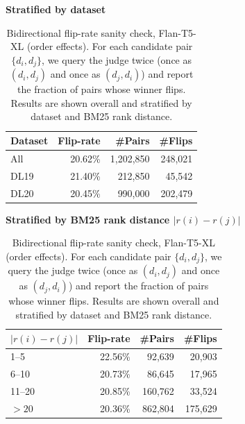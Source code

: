 \documentclass[11pt]{article}
\begin{document}
\begin{table}[!hbp]
\centering
\small
\renewcommand{\arraystretch}{1.15}
\setlength{\tabcolsep}{6pt}

\begin{minipage}[t]{0.48\textwidth}
\centering
\textbf{Stratified by dataset}\\[2pt]
\begin{tabular}{lrrr}
\hline
Dataset & Flip-rate & \#Pairs & \#Flips \\
\hline
All   & 20.62\% & 1,202,850 & 248,021 \\
DL19  & 21.40\% &   212,850 &  45,542 \\
DL20  & 20.45\% &   990,000 & 202,479 \\
\hline
\end{tabular}
\end{minipage}\hfill
\begin{minipage}[t]{0.48\textwidth}
\centering
\textbf{Stratified by BM25 rank distance $|r(i)-r(j)|$}\\[2pt]
\begin{tabular}{lrrr}
\hline
$|r(i)-r(j)|$ & Flip-rate & \#Pairs & \#Flips \\
\hline
1--5    & 22.56\% &  92,639 &  20,903 \\
6--10   & 20.73\% &  86,645 &  17,965 \\
11--20  & 20.85\% & 160,762 &  33,524 \\
$>20$   & 20.36\% & 862,804 & 175,629 \\
\hline
\end{tabular}
\end{minipage}

\caption{Bidirectional flip-rate sanity check, Flan-T5-XL (order effects). For each candidate pair $\{d_i,d_j\}$, we query the judge twice (once as $(d_i,d_j)$ and once as $(d_j,d_i)$) and report the fraction of pairs whose winner flips. Results are shown overall and stratified by dataset and BM25 rank distance.}
\label{tab:flip_rate_order_effects}
\end{table}
\end{document}
